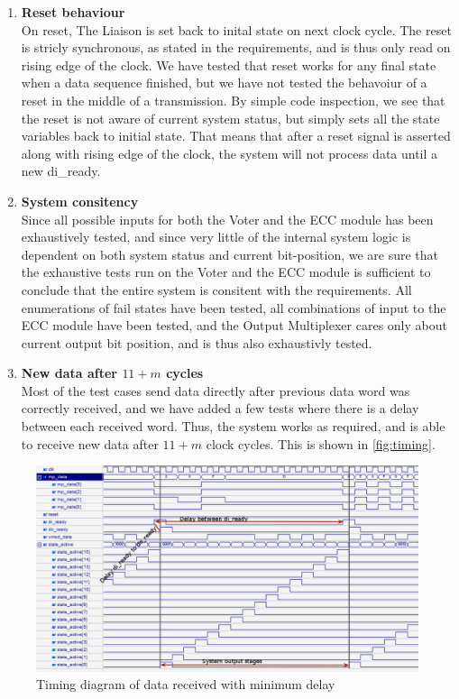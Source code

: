 \begin{enumerate}
    \item{\textbf{Reset behaviour}} \hfill\\
        On reset, The Liaison is set back to inital state on next clock cycle. The reset is stricly synchronous,
        as stated in the requirements\cite{task}, and is thus only read on rising edge of the clock. We have
        tested that reset works for any final state when a data sequence finished, but we have not tested the
        behavoiur of a reset in the middle of a transmission. By simple code inspection, we see that the
        reset is not aware of current system status, but simply sets all the state variables back to initial
        state. That means that after a reset signal is asserted along with rising edge of the clock, the system
        will not process data until a new {\ttfamily di\_ready}.

    \item{\textbf{System consitency}} \hfill\\
        Since all possible inputs for both the Voter and the ECC module has been exhaustively tested, and 
        since very little of the internal system logic is dependent on both system status and current bit-position,
        we are sure that the exhaustive tests run on the Voter and the ECC module is sufficient to conclude that 
        the entire system is consitent with the requirements. All enumerations of fail states have been tested, all combinations
        of input to the ECC module have been tested, and the Output Multiplexer cares only about current output bit position,
        and is thus also exhaustivly tested.

    \item{\textbf{New data after $11+m$ cycles}} \hfill\\
        Most of the test cases send data directly after previous data word was correctly received, and we have
        added a few tests where there is a delay between each received word. Thus, the system works as required,
        and is able to receive new data after $11+m$ clock cycles. This is shown in \autoref{fig:timing}.

\end{enumerate}

\begin{figure}
    \includegraphics[width=\textwidth]{tests/timing}
    \caption{Timing diagram of data received with minimum delay}
    \label{fig:timing}
\end{figure}
